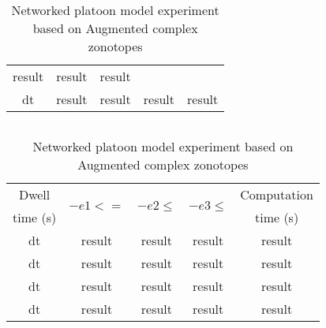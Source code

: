 \begin{table}
\begin{minipage}{0.45\textwidth}
\begin{tabular}{|c|c|c|c|c|}
\multirow{2}{*}{result} & \multirow{2}{*}{result} &
\multirow{2}{*}{result} \\
& & & & \\
\hline
\multirow{2}{*}{dt} & \multirow{2}{*}{result} &
\multirow{2}{*}{result} & \multirow{2}{*}{result} &
\multirow{2}{*}{result} \\
& & & & \\
\hline
\end{tabular}
\caption{Networked platoon model experiment in SpaceEx with 100 support
  vectors}
\vspace{0.5em}
\end{minipage}
$~$\\
$~$\\
\centering
\begin{tabular}{|c|c|c|c|c|}
\hline
Dwell & \multirow{2}{*}{$-e1<=$} & \multirow{2}{*}{$-e2\leq$} &
\multirow{2}{*}{$-e3\leq$} & Computation\\
time (s) & & & & time (s)\\
\hline
\multirow{2}{*}{dt} & \multirow{2}{*}{result} &
\multirow{2}{*}{result} & \multirow{2}{*}{result} &
\multirow{2}{*}{result} \\
& & & & \\
\hline
\multirow{2}{*}{dt} & \multirow{2}{*}{result} &
\multirow{2}{*}{result} & \multirow{2}{*}{result} &
\multirow{2}{*}{result} \\
& & & & \\
\hline
\multirow{2}{*}{dt} & \multirow{2}{*}{result} &
\multirow{2}{*}{result} & \multirow{2}{*}{result} &
\multirow{2}{*}{result} \\
& & & & \\
\hline
\multirow{2}{*}{dt} & \multirow{2}{*}{result} &
\multirow{2}{*}{result} & \multirow{2}{*}{result} &
\multirow{2}{*}{result} \\
& & & & \\
\hline
\end{tabular}
\caption{Networked platoon model experiment based on Augmented complex zonotopes}
\end{table}

